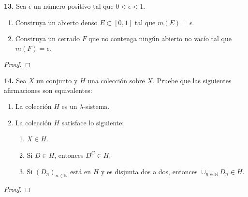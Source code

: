 \documentclass{article}
\newenvironment{statement}[1]{\smallskip\noindent\color[rgb]{1.00,0.00,0.50} {\bf #1.}}{}
\theoremstyle{definition}
\theoremstyle{remark}
\newcommand{\BN}{\mathbb N}
\begin{document}
\begin{statement}{13}
  Sea $\epsilon$ un n\'umero positivo tal que $0 < \epsilon < 1$.
  \begin{enumerate}
    \item Construya un abierto denso $E \subset [0, 1]$ tal que $m(E) = \epsilon$.
    \item Construya un cerrado $F$ que no contenga ning\'un abierto no vac\'io
    tal que $m(F) = \epsilon$.
  \end{enumerate}
\end{statement}

\begin{proof}
\end{proof}

\begin{statement}{14}
  Sea $X$ un conjunto y $H$ una colecci\'on sobre $X$. Pruebe que las siguientes
  afirmaciones son equivalentes:
  \begin{enumerate}
    \item La colecci\'on $H$ es un $\lambda$-sistema.
    \item La colecci\'on $H$ satisface lo siguiente:
    \begin{enumerate}
      \item $X \in H$.
      \item Si $D \in H$, entonces $D^C \in H$.
      \item Si $(D_n)_{n \in \BN}$ est\'a en $H$ y es disjunta dos a dos,
      entonces $\cup_{n \in \BN} D_n \in H$.
    \end{enumerate}
  \end{enumerate}
\end{statement}

\begin{proof}
\end{proof}
\end{document}
